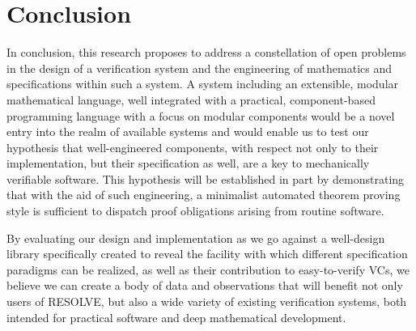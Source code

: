 \section{Conclusion}\label{sec:conclusion}
In conclusion, this research proposes to address a constellation of open problems in the design of a verification system and the engineering of mathematics and specifications within such a system.  A system including an extensible, modular mathematical language, well integrated with a practical, component-based programming language with a focus on modular components would be a novel entry into the realm of available systems and would enable us to test our hypothesis that well-engineered components, with respect not only to their implementation, but their specification as well, are a key to mechanically verifiable software.  This hypothesis will be established in part by demonstrating that with the aid of such engineering, a minimalist automated theorem proving style is sufficient to dispatch proof obligations arising from routine software.

By evaluating our design and implementation as we go against a well-design library specifically created to reveal the facility with which different specification paradigms can be realized, as well as their contribution to easy-to-verify VCs, we believe we can create a body of data and observations that will benefit not only users of RESOLVE, but also a wide variety of existing verification systems, both intended for practical software and deep mathematical development.
